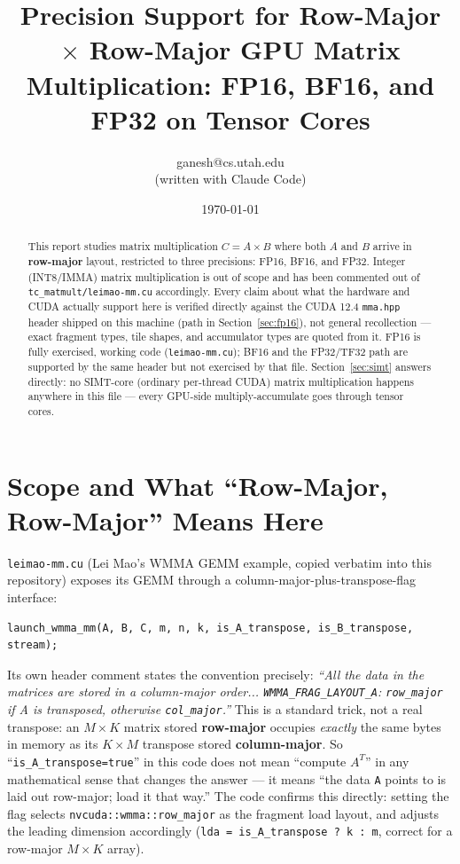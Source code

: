 \documentclass[11pt]{article}
\title{Precision Support for Row-Major $\times$ Row-Major GPU Matrix\\
Multiplication: FP16, BF16, and FP32 on Tensor Cores}
\author{ganesh@cs.utah.edu \\ \small (written with Claude Code)}
\date{\today}
\begin{document}
\maketitle

\begin{abstract}
This report studies matrix multiplication $C = A \times B$ where both $A$ and $B$ arrive
in \textbf{row-major} layout, restricted to three precisions: FP16, BF16, and FP32.
Integer (INT8/IMMA) matrix multiplication is out of scope and has been commented out of
\texttt{tc\_matmult/leimao-mm.cu} accordingly. Every claim about what the hardware and
CUDA actually support here is verified directly against the CUDA 12.4
\texttt{mma.hpp} header shipped on this machine (path in
Section~\ref{sec:fp16}), not general recollection --- exact fragment types, tile shapes,
and accumulator types are quoted from it. FP16 is fully exercised, working code
(\texttt{leimao-mm.cu}); BF16 and the FP32/TF32 path are supported by the same header but
not exercised by that file. Section~\ref{sec:simt} answers directly: no SIMT-core
(ordinary per-thread CUDA) matrix multiplication happens anywhere in this file --- every
GPU-side multiply-accumulate goes through tensor cores.
\end{abstract}

\tableofcontents

\section{Scope and What ``Row-Major, Row-Major'' Means Here}
\label{sec:scope}

\texttt{leimao-mm.cu} (Lei Mao's WMMA GEMM example, copied verbatim into this
repository) exposes its GEMM through a column-major-plus-transpose-flag interface:
\begin{lstlisting}
launch_wmma_mm(A, B, C, m, n, k, is_A_transpose, is_B_transpose, stream);
\end{lstlisting}
Its own header comment states the convention precisely: \emph{``All the data in the
matrices are stored in a column-major order... \texttt{WMMA\_FRAG\_LAYOUT\_A}:
\texttt{row\_major} if A is transposed, otherwise \texttt{col\_major}.''} This is a
standard trick, not a real transpose: an $M \times K$ matrix stored \textbf{row-major}
occupies \emph{exactly} the same bytes in memory as its $K \times M$ transpose stored
\textbf{column-major}. So ``\texttt{is\_A\_transpose=true}'' in this code does not mean
``compute $A^T$'' in any mathematical sense that changes the answer --- it means ``the
data \texttt{A} points to is laid out row-major; load it that way.'' The code confirms
this directly: setting the flag selects \texttt{nvcuda::wmma::row\_major} as the fragment
load layout, and adjusts the leading dimension accordingly
(\texttt{lda = is\_A\_transpose ? k : m}, correct for a row-major $M\times K$ array).
\end{document}
